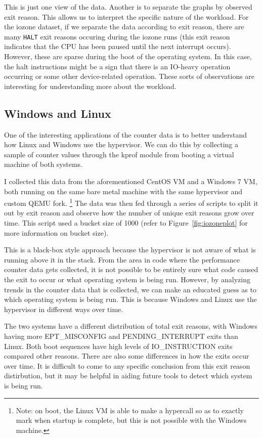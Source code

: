 \documentclass[notitlepage]{article}
\begin{document}
This is just one view of the data. Another is to separate the graphs by observed
exit reason. This allows us to interpret the specific nature of the workload.
For the iozone dataset, if we separate the data according to exit reason, there
are many \texttt{HALT} exit reasons occuring during the iozone runs (this exit
reason indicates that the CPU has been paused until the next interrupt occurs).
However, these are sparse during the boot of the operating system. In this case,
the halt instructions might be a sign that there is an IO-heavy operation
occurring or some other device-related operation. These sorts of observations
are interesting for understanding more about the workload.

\subsection{Windows and Linux}
One of the interesting applications of the counter data is to better understand
how Linux and Windows use the hypervisor. We can do this by collecting a sample
of counter values through the kprof module from booting a virtual machine of
both systems.

I collected this data from the aforementioned CentOS VM and a Windows 7 VM, both
running on the same bare metal machine with the same hypervisor and custom QEMU
fork. \footnote{Note: on boot, the Linux VM is able to make a hypercall so as to
    exactly mark when startup is complete, but this is not possible with the
Windows machine.} The data was then fed through a series of scripts to split it
out by exit reason and observe how the number of unique exit reasons grow over
time. This script used a bucket size of 1000 (refer to
Figure~\ref{fig:iozoneplot} for more information on bucket size).

This is a black-box style approach because the hypervisor is not aware of what
is running above it in the stack. From the area in code where the performance
counter data gets collected, it is not possible to be entirely sure what
code caused the exit to occur or what operating system is being run. However, by
analyzing trends in the counter data that is collected, we can make an educated
guess as to which operating system is being run. This is because Windows and
Linux use the hypervisor in different ways over time.

The two systems have a different distribution of total exit reasons, with
Windows having more EPT\_MISCONFIG and PENDING\_INTERRUPT exits than Linux. Both
boot sequences have high levels of IO\_INSTRUCTION exits compared other reasons.
There are also some differences in how the exits occur over time. It is
difficult to come to any specific conclusion from this exit reason distirbution,
but it may be helpful in aiding future tools to detect which system is being
run.
\end{document}
